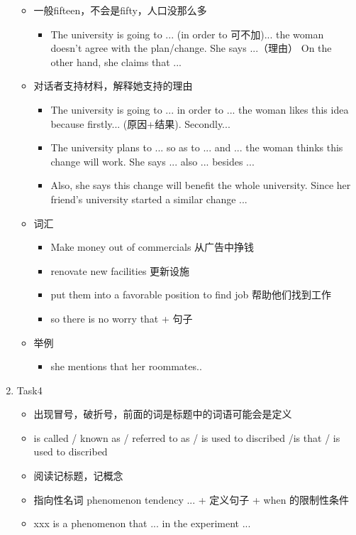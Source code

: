 \documentclass[UTF8]{ctexart}
\begin{document}
\begin{enumerate}
\begin{itemize}
  \item 一般fifteen，不会是fifty，人口没那么多
  \begin{itemize}
    \item The university is going to ... (in order to 可不加)... the woman doesn't agree with the plan/change. She says ...（理由） On the other hand, she claims that ...
  \end{itemize}
  \item 对话者支持材料，解释她支持的理由
  \begin{itemize}
    \item The university is going to ... in order to ... the woman likes this idea because firstly... (原因+结果). Secondly...
    \item The university plans to ... so as to ... and ... the woman thinks this change will work. She says ... also ... besides ...
    \item Also, she says this change will benefit the whole university. Since her friend's university started a similar change ...
  \end{itemize}
  \item 词汇
  \begin{itemize}
    \item Make money out of commercials 从广告中挣钱
    \item renovate new facilities 更新设施
    \item put them into a favorable position to find job 帮助他们找到工作
    \item so there is no worry that + 句子
  \end{itemize}
  \item 举例
  \begin{itemize}
    \item she mentions that her roommates..\\ 
  \end{itemize}
\end{itemize}
\item Task4
\begin{itemize}
  \item 出现冒号，破折号，前面的词是标题中的词语可能会是定义
  \item is called / known as / referred to as / is used to discribed /is that / is used to discribed
  \item 阅读记标题，记概念
  \item 指向性名词 phenomenon tendency ... + 定义句子 + when 的限制性条件
  \item xxx is a phenomenon that ... in the experiment ...

\end{itemize}
\end{enumerate}
\end{document}
